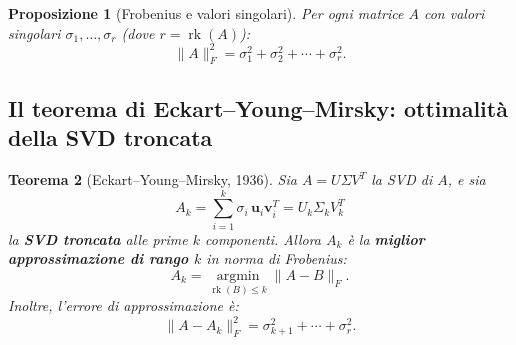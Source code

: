 \documentclass[11pt,a4paper]{article}
\theoremstyle{plain}
\newtheorem{teorema}{Teorema}[section]
\newtheorem{proposizione}[teorema]{Proposizione}
\theoremstyle{definition}
\theoremstyle{remark}
\begin{document}
\begin{proposizione}[Frobenius e valori singolari]
\label{prop:frob}
Per ogni matrice $A$ con valori singolari $\sigma_1, \ldots, \sigma_r$ (dove
$r = \operatorname{rk}(A)$):
\begin{equation}
  \|A\|_F^2 = \sigma_1^2 + \sigma_2^2 + \cdots + \sigma_r^2.
  \label{eq:frob_svd}
\end{equation}
\end{proposizione}



\subsection{Il teorema di Eckart--Young--Mirsky: ottimalità della SVD troncata}

\begin{teorema}[Eckart--Young--Mirsky, 1936]
\label{thm:ey}
Sia $A = U \Sigma V^T$ la SVD di $A$, e sia
\[
  A_k = \sum_{i=1}^{k} \sigma_i \, \mathbf{u}_i \mathbf{v}_i^T
  = U_k \Sigma_k V_k^T
\]
la \textbf{SVD troncata} alle prime $k$ componenti. Allora $A_k$ è la
\textbf{miglior approssimazione di rango $k$} in norma di Frobenius:
\[
  A_k = \operatorname*{argmin}_{\operatorname{rk}(B) \leq k} \|A - B\|_F.
\]
Inoltre, l'errore di approssimazione è:
\begin{equation}
  \|A - A_k\|_F^2 = \sigma_{k+1}^2 + \cdots + \sigma_r^2.
  \label{eq:ey_errore}
\end{equation}
\end{teorema}



\end{document}
